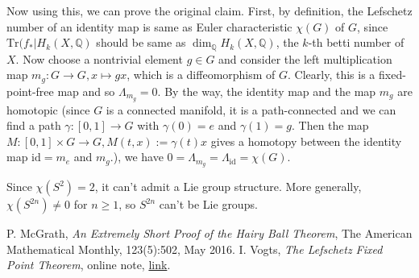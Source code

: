 \documentclass{article}
\begin{document}
Now using this, we can prove the original claim. First, by definition, the Lefschetz number of an identity map is same as Euler characteristic $\chi(G)$ of $G$, since $\mathrm{Tr}(f_{*}|H_{k}(X, \mathbb{Q})$ should be same as $\dim_{\mathbb{Q}}H_{k}(X, \mathbb{Q})$, the $k$-th betti number of $X$. 
Now choose a nontrivial element $g\in G$ and consider the left multiplication map $m_{g}:G\to G, x\mapsto gx$, which is a diffeomorphism of $G$. Clearly, this is a fixed-point-free map and so $\Lambda_{m_{g}}=0$. 
By the way, the identity map and the map $m_{g}$ are homotopic (since $G$ is a connected manifold, it is a path-connected and we can find a path $\gamma:[0, 1]\to G$ with $\gamma(0) = e$ and $\gamma(1) =  g$. Then the map $M:[0, 1]\times G\to G, M(t, x):=\gamma(t)x$ gives a homotopy between the identity map $\mathrm{id} = m_{e}$ and $m_{g}$.), we have $0=\Lambda_{m_{g}} = \Lambda_{\mathrm{id}} = \chi(G)$. 

Since $\chi(S^{2}) = 2$, it can't admit a Lie group structure. More generally, $\chi(S^{2n})\neq 0$ for $n\geq 1$, so $S^{2n}$ can't be Lie groups. 

\begin{thebibliography}{5}
P. McGrath, \emph{An Extremely Short Proof of the Hairy Ball Theorem}, The American Mathematical Monthly, 123(5):502, May 2016. 
I. Vogts, \emph{The Lefschetz Fixed Point Theorem}, online note, \href{http://www.mit.edu/~ivogt/LefschetzFixedPointTheorem.pdf}{link}. 
\end{thebibliography}
\end{document}
